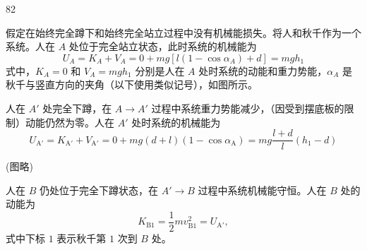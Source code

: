 \begin{solution}{82}
    \begin{subsolution}
        \begin{subsubsolution}
            假定在始终完全蹲下和始终完全站立过程中没有机械能损失。将人和秋千作为一个系统。人在 $A$ 处位于完全站立状态，此时系统的机械能为
            \begin{equation}
                U_{A}=K_{A}+V_{A}=0+mg[l(1-\cos\alpha_{A})+d]=mgh_{1}
                \label{eq:1.s82}
            \end{equation}
            式中，$K_{A}=0$ 和 $V_{A}=mgh_{1}$ 分别是人在 $A$ 处时系统的动能和重力势能，$\alpha_{A}$ 是秋千与竖直方向的夹角（以下使用类似记号），如图所示。

            人在 $A'$ 处完全下蹲，在 $A\rightarrow A'$ 过程中系统重力势能减少，（因受到摆底板的限制）动能仍然为零。人在 $A'$ 处时系统的机械能为
            \begin{equation}
                U_{\mathrm{A'}} = K_{\mathrm{A'}} + V_{\mathrm{A'}} = 0 + mg(d+l)(1-\cos\alpha_{\mathrm{A}}) = mg\frac{l+d}{l}(h_{1}-d)
                \label{eq:2.s82}
            \end{equation}

            (图略)

            人在 $B$ 仍处位于完全下蹲状态，在 $A'\rightarrow B$ 过程中系统机械能守恒。人在 $B$ 处的动能为
            \begin{equation}
                K_{\mathrm{B1}} = \frac{1}{2} m v_{\mathrm{B1}}^{2} = U_{\mathrm{A'}},
                \label{eq:3.s82}
            \end{equation}
            式中下标 $1$ 表示秋千第 $1$ 次到 $B$ 处。


\end{subsubsolution}
\end{subsolution}
\end{solution}
